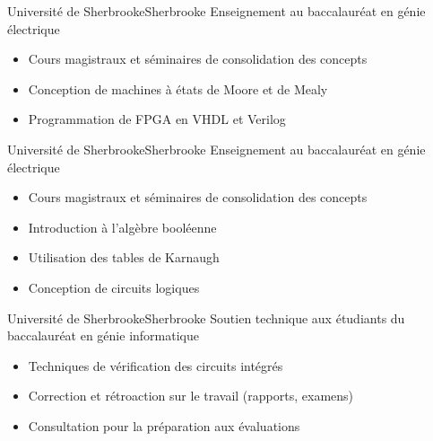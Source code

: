 
{Université de Sherbrooke}{Sherbrooke}
{Enseignement au baccalauréat en génie électrique}
{\vspace{-12pt}
\begin{itemize}
	\item Cours magistraux et séminaires de consolidation des concepts
	\item Conception de machines à états de Moore et de Mealy
	\item Programmation de FPGA en VHDL et Verilog
\end{itemize}}

{Université de Sherbrooke}{Sherbrooke}
{Enseignement au baccalauréat en génie électrique}
{\vspace{-12pt}
\begin{itemize}
	\item Cours magistraux et séminaires de consolidation des concepts
	\item Introduction à l'algèbre booléenne
	\item Utilisation des tables de Karnaugh
	\item Conception de circuits logiques
\end{itemize}}

{Université de Sherbrooke}{Sherbrooke}
{Soutien technique aux étudiants du baccalauréat en génie informatique}
{\vspace{-12pt}
\begin{itemize}
	\item Techniques de vérification des circuits intégrés
	\item Correction et rétroaction sur le travail (rapports, examens)
	\item Consultation pour la préparation aux évaluations
\end{itemize}}

